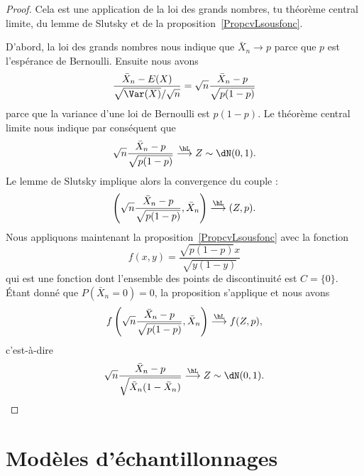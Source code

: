\begin{proof}
	Cela est une application de la loi des grands nombres, tu théorème central limite, du lemme de Slutsky et de la proposition~\ref{PropcvLsousfonc}.

	D'abord, la loi des grands nombres nous indique que \( \bar X_n\to p\) parce que \( p\) est l'espérance de Bernoulli. Ensuite nous avons
	\begin{equation}
		\frac{ \bar X_n-E(X) }{ \sqrt{\Var(X)}/\sqrt{n} }=\sqrt{n}\frac{ \bar X_n-p }{ \sqrt{p(1-p)} }
	\end{equation}
	parce que la variance d'une loi de Bernoulli est \( p(1-p)\). Le théorème central limite nous indique par conséquent que
	\begin{equation}
		\sqrt{n}\frac{ \bar X_n-p }{ \sqrt{p(1-p)} }\stackrel{\hL}{\longrightarrow}Z\sim\dN(0,1).
	\end{equation}
	Le lemme de Slutsky implique alors la convergence du couple :
	\begin{equation}
		\left( \sqrt{n}\frac{ \bar X_n-p }{ \sqrt{p(1-p)} },\bar X_n \right)\stackrel{\hL}{\longrightarrow}(Z,p).
	\end{equation}
	Nous appliquons maintenant la proposition~\ref{PropcvLsousfonc} avec la fonction
	\begin{equation}
		f(x,y)=\frac{ \sqrt{p(1-p)}x }{ \sqrt{y(1-y)} }
	\end{equation}
	qui est une fonction dont l'ensemble des points de discontinuité est \( C=\{ 0 \}\). Étant donné que \( P(\bar X_n=0)=0\), la proposition s'applique et nous avons
	\begin{equation}
		f\left( \sqrt{n}\frac{ \bar X_n-p }{ \sqrt{p(1-p)} },\bar X_n \right)\stackrel{\hL}{\longrightarrow}f(Z,p),
	\end{equation}
	c'est-à-dire
	\begin{equation}
		\sqrt{n}\frac{ \bar X_n-p }{ \sqrt{\bar X_n(1-\bar X_n)} }\stackrel{\hL}{\longrightarrow}Z\sim\dN(0,1).
	\end{equation}
\end{proof}

\section{Modèles d'échantillonnages}

